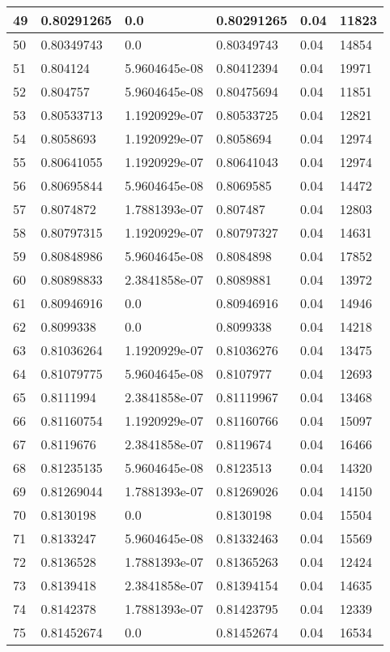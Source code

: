 \begin{longtable}{|l|l|l|l|l|l|}
49 & 0.80291265 & 0.0 & 0.80291265 & 0.04 & 11823 \\ \hline 
50 & 0.80349743 & 0.0 & 0.80349743 & 0.04 & 14854 \\ \hline 
51 & 0.804124 & 5.9604645e-08 & 0.80412394 & 0.04 & 19971 \\ \hline 
52 & 0.804757 & 5.9604645e-08 & 0.80475694 & 0.04 & 11851 \\ \hline 
53 & 0.80533713 & 1.1920929e-07 & 0.80533725 & 0.04 & 12821 \\ \hline 
54 & 0.8058693 & 1.1920929e-07 & 0.8058694 & 0.04 & 12974 \\ \hline 
55 & 0.80641055 & 1.1920929e-07 & 0.80641043 & 0.04 & 12974 \\ \hline 
56 & 0.80695844 & 5.9604645e-08 & 0.8069585 & 0.04 & 14472 \\ \hline 
57 & 0.8074872 & 1.7881393e-07 & 0.807487 & 0.04 & 12803 \\ \hline 
58 & 0.80797315 & 1.1920929e-07 & 0.80797327 & 0.04 & 14631 \\ \hline 
59 & 0.80848986 & 5.9604645e-08 & 0.8084898 & 0.04 & 17852 \\ \hline 
60 & 0.80898833 & 2.3841858e-07 & 0.8089881 & 0.04 & 13972 \\ \hline 
61 & 0.80946916 & 0.0 & 0.80946916 & 0.04 & 14946 \\ \hline 
62 & 0.8099338 & 0.0 & 0.8099338 & 0.04 & 14218 \\ \hline 
63 & 0.81036264 & 1.1920929e-07 & 0.81036276 & 0.04 & 13475 \\ \hline 
64 & 0.81079775 & 5.9604645e-08 & 0.8107977 & 0.04 & 12693 \\ \hline 
65 & 0.8111994 & 2.3841858e-07 & 0.81119967 & 0.04 & 13468 \\ \hline 
66 & 0.81160754 & 1.1920929e-07 & 0.81160766 & 0.04 & 15097 \\ \hline 
67 & 0.8119676 & 2.3841858e-07 & 0.8119674 & 0.04 & 16466 \\ \hline 
68 & 0.81235135 & 5.9604645e-08 & 0.8123513 & 0.04 & 14320 \\ \hline 
69 & 0.81269044 & 1.7881393e-07 & 0.81269026 & 0.04 & 14150 \\ \hline 
70 & 0.8130198 & 0.0 & 0.8130198 & 0.04 & 15504 \\ \hline 
71 & 0.8133247 & 5.9604645e-08 & 0.81332463 & 0.04 & 15569 \\ \hline 
72 & 0.8136528 & 1.7881393e-07 & 0.81365263 & 0.04 & 12424 \\ \hline 
73 & 0.8139418 & 2.3841858e-07 & 0.81394154 & 0.04 & 14635 \\ \hline 
74 & 0.8142378 & 1.7881393e-07 & 0.81423795 & 0.04 & 12339 \\ \hline 
75 & 0.81452674 & 0.0 & 0.81452674 & 0.04 & 16534 \\ \hline 
\end{longtable}